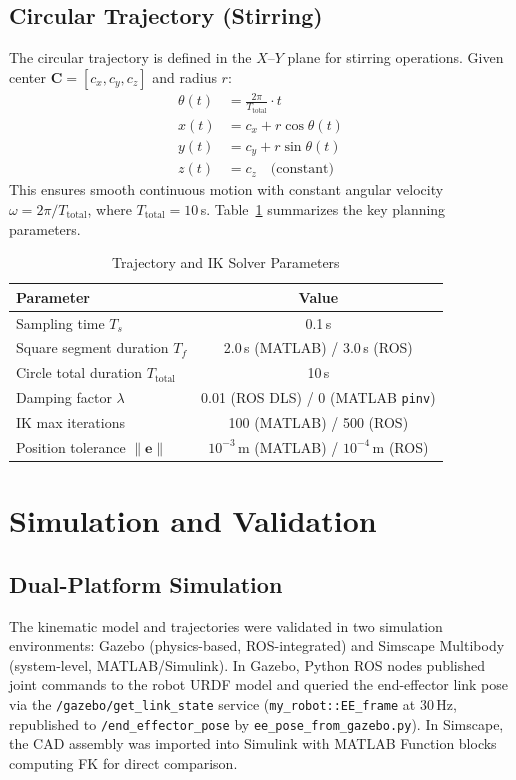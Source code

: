 \documentclass[conference]{IEEEtran}
\begin{document}
\subsection{Circular Trajectory (Stirring)}

The circular trajectory is defined in the $X$--$Y$ plane for stirring operations. Given center $\mathbf{C} = [c_x, c_y, c_z]$ and radius $r$:
\begin{align}
\theta(t) &= \frac{2\pi}{T_{\text{total}}} \cdot t \label{eq:theta} \\
x(t) &= c_x + r\cos\theta(t) \label{eq:cx} \\
y(t) &= c_y + r\sin\theta(t) \label{eq:cy} \\
z(t) &= c_z \quad \text{(constant)} \label{eq:cz}
\end{align}
This ensures smooth continuous motion with constant angular velocity $\omega = 2\pi / T_{\text{total}}$, where $T_{\text{total}} = 10$\,s. Table~\ref{tab:params} summarizes the key planning parameters.

\begin{table}[H]
\centering
\caption{Trajectory and IK Solver Parameters}
\label{tab:params}
\begin{tabular}{lc}
\toprule
\textbf{Parameter} & \textbf{Value} \\
\midrule
Sampling time $T_s$ & 0.1\,s \\
Square segment duration $T_f$ & 2.0\,s (MATLAB) / 3.0\,s (ROS) \\
Circle total duration $T_{\text{total}}$ & 10\,s \\
Damping factor $\lambda$ & 0.01 (ROS DLS) / 0 (MATLAB \texttt{pinv}) \\
IK max iterations & 100 (MATLAB) / 500 (ROS) \\
Position tolerance $\|\mathbf{e}\|$ & $10^{-3}$\,m (MATLAB) / $10^{-4}$\,m (ROS) \\
\bottomrule
\end{tabular}
\end{table}

\section{Simulation and Validation}

\subsection{Dual-Platform Simulation}

The kinematic model and trajectories were validated in two simulation environments: Gazebo (physics-based, ROS-integrated) and Simscape Multibody (system-level, MATLAB/Simulink). In Gazebo, Python ROS nodes published joint commands to the robot URDF model and queried the end-effector link pose via the \texttt{/gazebo/get\_link\_state} service (\texttt{my\_robot::EE\_frame} at 30\,Hz, republished to \texttt{/end\_effector\_pose} by \texttt{ee\_pose\_from\_gazebo.py}). In Simscape, the CAD assembly was imported into Simulink with MATLAB Function blocks computing FK for direct comparison.
\end{document}

